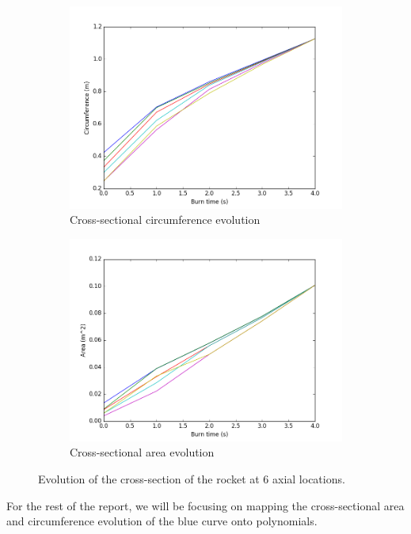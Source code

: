 \begin{figure}
    \begin{subfigure}{0.48\textwidth}
        \includegraphics[width = 0.9\linewidth]{figures/cprofile.png}
        \caption{Cross-sectional circumference evolution}
        \label{fig:csec}
    \end{subfigure}
    \begin{subfigure}{0.48\textwidth}
        \includegraphics[width = 0.9\linewidth]{figures/aprofile.png}
        \caption{Cross-sectional area evolution}
        \label{fig:asec}
    \end{subfigure}
    \caption{Evolution of the cross-section of the rocket at 6 axial locations.}
    \label{fig:profiles}
\end{figure}

For the rest of the report, we will be focusing on mapping the cross-sectional
area and circumference evolution of the blue curve onto polynomials.
